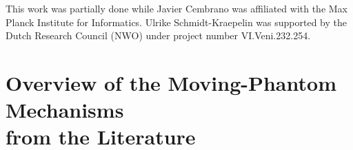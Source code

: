 \documentclass[11pt]{article}
\begin{document}
This work was partially done while Javier Cembrano was affiliated with the Max Planck Institute for Informatics. Ulrike Schmidt-Kraepelin was supported by the Dutch Research Council (NWO) under project number VI.Veni.232.254.







\clearpage

 

\appendix


\pagebreak

\section{Overview of the Moving-Phantom Mechanisms \\ from the Literature}
\label{app:mp-mechs}


\newcommand{\plotPhantom}[2]{
    \draw[phantom] (0,#1) to (100,#1) node[phlabel]{#2};
}
\newcommand{\plotPhantoms}[2]{
    \draw[phantoms] (0,#1) to (100,#1) node[phlabel]{#2};
}
\newcommand{\plotMovingPhantom}[3]{
    \plotPhantom{#1}{#2}
    \draw[phantom, -{Latex[length=3,width=3]}, opacity=#3] (50,#1) -- (50,#1+2+5*#3); 
}
\newcommand{\plotMovingPhantoms}[3]{
    \plotPhantoms{#1}{#2}
    \draw[phantom, -{Latex[length=3,width=3]}, opacity=#3] (50,#1) -- (50,#1+2+5*#3); 
}

\newcommand{\plotPhantomSystemChart}[1]{
    \adjustbox{valign=c}{\begin{tikzpicture}[xscale=0.005, yscale=0.035]
        \draw (-5,0) -- (-5,100);  
        \draw (-15,0) -- (5,0); 
        \draw (-15,100) -- (5,100); 
        \node[anchor=east, xshift=0px] at (0,0) {$0$}; 
        \node[anchor=east, xshift=0px] at (0,100) {$1$}; 
        \phantom{\plotPhantoms{100}{$f_0$--$f_2$};}
        #1
    \end{tikzpicture}}
}
\newcommand{\plotPhantomSystemChartNoLabels}[1]{
    \adjustbox{valign=c}{\begin{tikzpicture}[xscale=0.005, yscale=0.035]
        \draw (-5,0) -- (-5,100);  
        \draw (-15,0) -- (5,0); 
        \draw (-15,100) -- (5,100); 
        \phantom{\plotPhantoms{100}{$f_0$--$f_2$};}
        #1
    \end{tikzpicture}}
}
\end{document}
